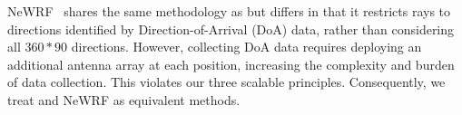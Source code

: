 NeWRF~\cite{lunewrf} shares the same methodology as \nerft but differs in that it restricts rays to directions identified by Direction-of-Arrival (DoA) data, rather than considering all \(360*90\) directions.  
However, collecting DoA data requires deploying an additional antenna array at each position, increasing the complexity and burden of data collection.
This violates our three scalable principles.  
Consequently, we treat \nerft and NeWRF as equivalent methods.  



